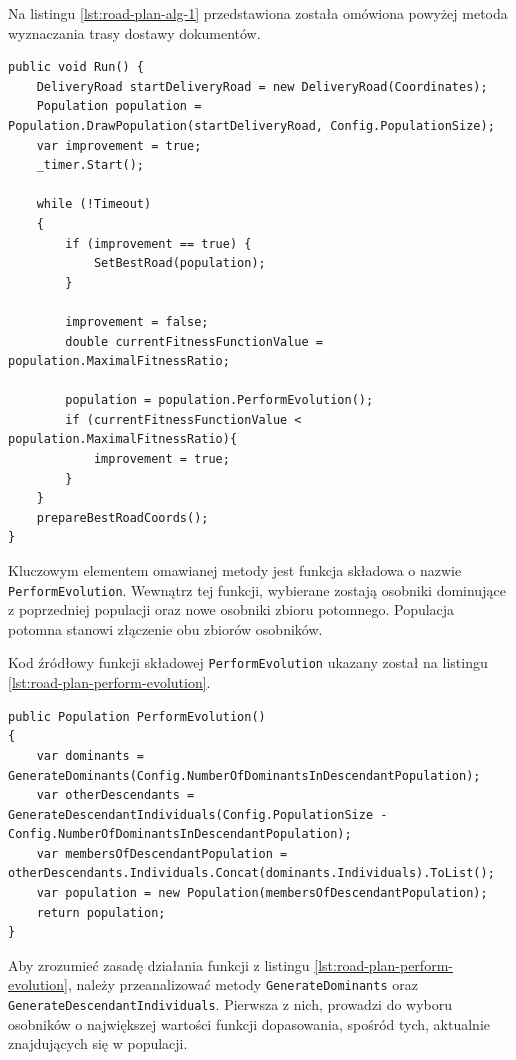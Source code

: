 Na listingu \ref{lst:road-plan-alg-1} przedstawiona została omówiona powyżej metoda wyznaczania trasy dostawy dokumentów.

\begin{lstlisting}[label=lst:road-plan-alg-1,caption=Kod metody odpowiedzialnej za wyznaczenie trasy dostawy dla zbioru dokumentów, captionpos=b,basicstyle=\footnotesize\ttfamily,style=sharpcstyle,language={[Sharp]C}]
public void Run() {
	DeliveryRoad startDeliveryRoad = new DeliveryRoad(Coordinates);
	Population population = Population.DrawPopulation(startDeliveryRoad, Config.PopulationSize);
	var improvement = true;
	_timer.Start();

	while (!Timeout)
	{
		if (improvement == true) {
			SetBestRoad(population);
		}
		
		improvement = false;
		double currentFitnessFunctionValue = population.MaximalFitnessRatio;

		population = population.PerformEvolution();
		if (currentFitnessFunctionValue < population.MaximalFitnessRatio){
			improvement = true;
		}
	}
	prepareBestRoadCoords();
}
\end{lstlisting}

Kluczowym elementem omawianej metody jest funkcja składowa o nazwie \texttt{PerformEvolution}. Wewnątrz tej funkcji, wybierane zostają osobniki dominujące z poprzedniej populacji oraz nowe osobniki zbioru potomnego. Populacja potomna stanowi złączenie obu zbiorów osobników.

Kod źródłowy funkcji składowej \texttt{PerformEvolution} ukazany został na listingu \ref{lst:road-plan-perform-evolution}. 

\begin{lstlisting}[label=lst:road-plan-perform-evolution,caption=Kod funkcji składowej wyboru populacji potomnej, captionpos=b,basicstyle=\footnotesize\ttfamily,style=sharpcstyle,language={[Sharp]C}]
public Population PerformEvolution()
{
	var dominants = GenerateDominants(Config.NumberOfDominantsInDescendantPopulation);
	var otherDescendants = GenerateDescendantIndividuals(Config.PopulationSize - Config.NumberOfDominantsInDescendantPopulation);
	var membersOfDescendantPopulation = otherDescendants.Individuals.Concat(dominants.Individuals).ToList();
	var population = new Population(membersOfDescendantPopulation);
	return population;
}
\end{lstlisting}

Aby zrozumieć zasadę działania funkcji z listingu \ref{lst:road-plan-perform-evolution}, należy przeanalizować metody \texttt{GenerateDominants} oraz \texttt{GenerateDescendantIndividuals}. Pierwsza z nich, prowadzi do wyboru osobników o największej wartości funkcji dopasowania, spośród tych, aktualnie znajdujących się w populacji.

